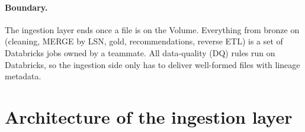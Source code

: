 \documentclass[12pt,a4paper]{article}
\begin{document}
\paragraph{Boundary.} The ingestion layer ends once a file is on the Volume. Everything from bronze on (cleaning,
MERGE by LSN, gold, recommendations, reverse ETL) is a set of Databricks jobs owned by a teammate. All data-quality
(DQ) rules run on Databricks, so the ingestion side only has to deliver well-formed files with lineage metadata.

\section{Architecture of the ingestion layer}
\end{document}

